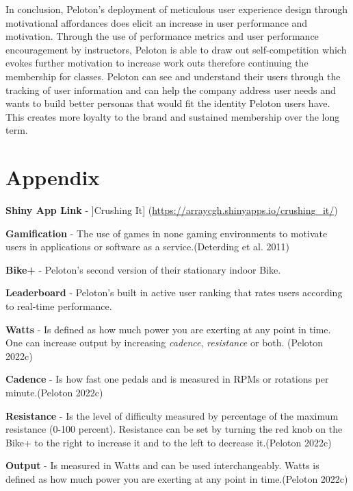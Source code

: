 \documentclass[
]{article}
\begin{document}
In conclusion, Peloton's deployment of meticulous user experience design through motivational affordances does elicit an increase in user performance and motivation. Through the use of performance metrics and user performance encouragement by instructors, Peloton is able to draw out self-competition which evokes further motivation to increase work outs therefore continuing the membership for classes. Peloton can see and understand their users through the tracking of user information and can help the company address user needs and wants to build better personas that would fit the identity Peloton users have. This creates more loyalty to the brand and sustained membership over the long term.

\newpage

\appendix

\hypertarget{appendix}{%
\section*{Appendix}\label{appendix}}

\textbf{Shiny App Link} - {]}Crushing It{]} (\url{https://arraycgh.shinyapps.io/crushing_it/})

\textbf{Gamification} - The use of games in none gaming environments to motivate users in applications or software as a service.(Deterding et al. 2011)

\textbf{Bike+} - Peloton's second version of their stationary indoor Bike.

\textbf{Leaderboard} - Peloton's built in active user ranking that rates users according to real-time performance.

\textbf{Watts} - Is defined as how much power you are exerting at any point in time. One can increase output by increasing \emph{cadence}, \emph{resistance} or both. (Peloton 2022c)

\textbf{Cadence} - Is how fast one pedals and is measured in RPMs or rotations per minute.(Peloton 2022c)

\textbf{Resistance} - Is the level of difficulty measured by percentage of the maximum resistance (0-100 percent). Resistance can be set by turning the red knob on the Bike+ to the right to increase it and to the left to decrease it.(Peloton 2022c)

\textbf{Output} - Is measured in Watts and can be used interchangeably. Watts is defined as how much power you are exerting at any point in time.(Peloton 2022c)
\end{document}

